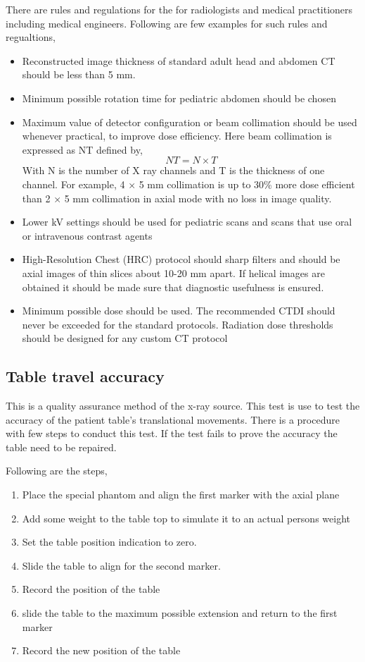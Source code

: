 \documentclass[12pt]{article}
\begin{document}
There are rules and regulations for the for radiologists and medical practitioners including medical engineers. Following are few examples for such rules and regualtions,

\begin{itemize}
    \item Reconstructed image thickness of standard adult head and abdomen CT should be less than 5 mm.
    \item Minimum possible rotation time for pediatric abdomen should be chosen
    \item Maximum value of detector configuration or beam collimation should be used whenever practical, to improve dose efficiency. Here beam collimation is expressed as NT defined by,
    \begin{equation*}
        NT = N \times T
    \end{equation*}
    With N is the number of X ray channels and T is the thickness of one channel. For example, 4 × 5 mm collimation is up to 30\% more dose efficient than 2 × 5 mm collimation in axial mode with no loss in image quality.
    \item Lower kV settings should be used for pediatric scans and scans that use oral or intravenous contrast agents
    \item High-Resolution Chest (HRC) protocol should sharp filters and should be axial images of thin slices about 10-20 mm apart. If helical images are obtained it should be made sure that diagnostic usefulness is ensured.
    \item Minimum possible dose should be used. The recommended CTDI should never be exceeded for the standard protocols. Radiation dose thresholds should be designed for any custom CT protocol
\end{itemize}

\subsection{Table travel accuracy}
This is a quality assurance method of the x-ray source. This test is use to test the accuracy of the patient table's translational movements. There is a procedure with few steps to conduct this test. If the test fails to prove the accuracy the table need to be repaired. 

Following are the steps,
\begin{enumerate}
    \item Place the special phantom and align the first marker with the axial plane
    \item Add some weight to the table top to simulate it to an actual persons weight
    \item Set the table position indication to zero.
    \item Slide the table to align for the second marker.
    \item Record the position of the table
    \item slide the table to the maximum possible extension and return to the first marker
    \item Record the new position of the table
\end{enumerate}
\end{document}
